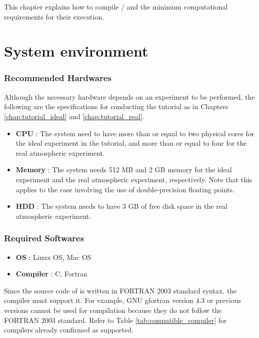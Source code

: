 This chapter explains how to compile \scalelib / \scalerm
and the minimum computational requirements for their execution.

\section{System environment} \label{sec:req_env}
\subsubsection{Recommended Hardwares}

  Although the necessary hardware depends on an experiment to be performed,
the following are the specifications for conducting the tutorial as in Chapters \ref{chap:tutorial_ideal} and \ref{chap:tutorial_real}.

  \begin{itemize}
    \item {\bf CPU} :
    The system need to have more than or equal to two physical cores for the ideal experiment in the tutorial, and more than or equal to four for the real atmospheric experiment.
    \item {\bf Memory} :
    The system needs 512 MB and 2 GB memory
    for the ideal experiment and the real atmospheric experiment, respectively.
    Note that this applies to the case involving the use of double-precision floating points.
    \item {\bf HDD} : The system needs to have 3 GB of free disk space in the real atmospheric experiment.
  \end{itemize}


\subsubsection{Required Softwares}

  \begin{itemize}
  \item {\bf OS} : Linux OS, Mac OS
  \item {\bf Compiler} : C, Fortran
  \end{itemize}

Since the source code of \scalelib is  written in FORTRAN 2003 standard syntax, the compiler must support it. For example, GNU gfortran version 4.3 or previous versions cannot be used for \scalelib compilation because they do not follow the FORTRAN 2003 standard. Refer to Table \ref{tab:compatible_compiler} for compilers already confirmed as supported.


